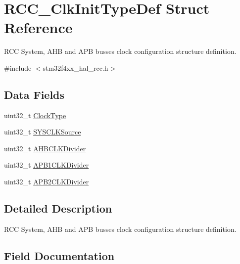 \hypertarget{struct_r_c_c___clk_init_type_def}{}\section{R\+C\+C\+\_\+\+Clk\+Init\+Type\+Def Struct Reference}
\label{struct_r_c_c___clk_init_type_def}


R\+CC System, A\+HB and A\+PB busses clock configuration structure definition.  




{\ttfamily \#include $<$stm32f4xx\+\_\+hal\+\_\+rcc.\+h$>$}

\subsection*{Data Fields}
\begin{DoxyCompactItemize}
\item 
uint32\+\_\+t \mbox{\hyperlink{struct_r_c_c___clk_init_type_def_afe92b105bff8e698233c286bb3018384}{Clock\+Type}}
\item 
uint32\+\_\+t \mbox{\hyperlink{struct_r_c_c___clk_init_type_def_a02b70c23b593a55814d887f483ea0871}{S\+Y\+S\+C\+L\+K\+Source}}
\item 
uint32\+\_\+t \mbox{\hyperlink{struct_r_c_c___clk_init_type_def_a082c91ea9f270509aca7ae6ec42c2a54}{A\+H\+B\+C\+L\+K\+Divider}}
\item 
uint32\+\_\+t \mbox{\hyperlink{struct_r_c_c___clk_init_type_def_a994aca51c40decfc340e045da1a6ca19}{A\+P\+B1\+C\+L\+K\+Divider}}
\item 
uint32\+\_\+t \mbox{\hyperlink{struct_r_c_c___clk_init_type_def_a9bbc30e9f4ddf462bc1fa6ea273eb4db}{A\+P\+B2\+C\+L\+K\+Divider}}
\end{DoxyCompactItemize}


\subsection{Detailed Description}
R\+CC System, A\+HB and A\+PB busses clock configuration structure definition. 

\subsection{Field Documentation}
\mbox{\label{struct_r_c_c___clk_init_type_def_a082c91ea9f270509aca7ae6ec42c2a54}} 
